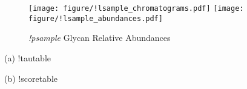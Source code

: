     \begin{figure}[!htbp]
        \centering
        \texttt{[image: figure/!lsample\_chromatograms.pdf]}
        \texttt{[image: figure/!lsample\_abundances.pdf]}
        \caption{\textit{!psample} Glycan Relative Abundances}
        \label{fig:!lsample_aggregated_eics}
    \end{figure}

    \begin{table}
        \begin{minipage}[t]{0.25\linewidth}
            \vspace{0pt}
            (a)
            \centering
            !tautable
            
        \end{minipage}
        \hspace{1cm}
        \begin{minipage}[t]{0.55\linewidth}
            \vspace{0pt}
            (b)
            \centering
            !scoretable
        \end{minipage}
        \caption{
                 Search Results for \textit{!psample}.
                 (a) Estimated $\mathbf{\tau}$ for !tsample with ${\hat \gamma} = !gamma$.
                 (b) Scores For Identified Glycans of !tsample with ${\hat \lambda} = !lambda$.}
        \label{tbl:!lsample_score_table}
    \end{table}
